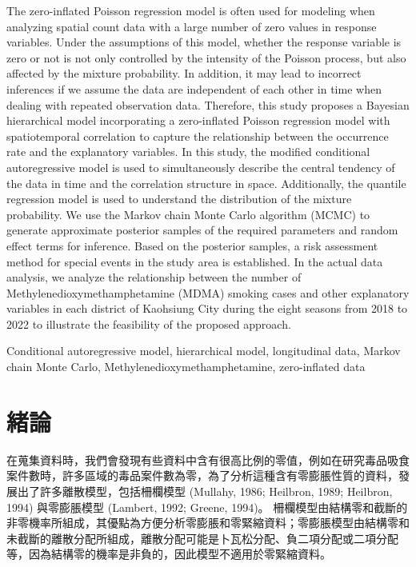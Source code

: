 \documentclass[12pt,a4paper]{article}
\begin{document}
\begin{CJK}{UTF8}{bkai}
\noindent
\fontsize{12}{20pt}\selectfont
The zero-inflated Poisson regression model is often used for modeling when analyzing spatial count data with a large number of zero values in response variables.
Under the assumptions of this model, whether the response variable is zero or not is not only controlled by the intensity of the Poisson process, but also affected by the mixture probability.
In addition, it may lead to incorrect inferences if we assume the data are independent of each other in time when dealing with repeated observation data.
Therefore, this study proposes a Bayesian hierarchical model incorporating a zero-inflated Poisson regression model with spatiotemporal correlation to capture the relationship between the occurrence rate and the explanatory variables.
In this study, the modified conditional autoregressive model is used to simultaneously describe the central tendency of the data in time and the correlation structure in space.
Additionally, the quantile regression model is used to understand the distribution of the mixture probability.
We use the Markov chain Monte Carlo algorithm (MCMC) to generate approximate posterior samples of the required parameters and random effect terms for inference.
Based on the posterior samples, a risk assessment method for special events in the study area is established.
In the actual data analysis, we analyze the relationship between the number of Methylenedioxymethamphetamine (MDMA) smoking cases and other explanatory variables in each district of Kaohsiung City during the eight seasons from 2018 to 2022  to illustrate the feasibility of the proposed approach.

  {Conditional autoregressive model, hierarchical model, longitudinal data, Markov chain Monte Carlo, Methylenedioxymethamphetamine, zero-inflated data}

\newpage


\setcounter{page}{1}
\section{緒論}\label{sec:1}
\fontsize{12}{20pt}\selectfont
在蒐集資料時，我們會發現有些資料中含有很高比例的零值，例如在研究毒品吸食案件數時，許多區域的毒品案件數為零，為了分析這種含有零膨脹性質的資料，發展出了許多離散模型，包括柵欄模型  (Mullahy, 1986; Heilbron, 1989; Heilbron, 1994) 與零膨脹模型 (Lambert, 1992; Greene, 1994)。
柵欄模型由結構零和截斷的非零機率所組成，其優點為方便分析零膨脹和零緊縮資料；零膨脹模型由結構零和未截斷的離散分配所組成，離散分配可能是卜瓦松分配、負二項分配或二項分配等，因為結構零的機率是非負的，因此模型不適用於零緊縮資料。


\end{CJK}
\end{document}
